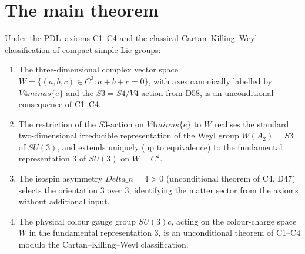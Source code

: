 \documentclass[11pt,a4paper]{article}
\def\Sfour{S4}%
\def\Vfour{V4}%
\def\Sthree{S3}%
\def\SUthree{SU(3)}%
\def\SUthreec{SU(3)c}%
\def\PDL{PDL}%
\def\cong{=}%
\def\setminus{ minus }%
\def\mathbb#1{#1}%
\def\mathrm#1{#1}%
\def\mathbf#1{#1}%
\def\textsc#1{#1}%
\def\Dn{Delta\_n}%
\newenvironment{theorembox}[1][]{%
  \begin{tcolorbox}[theoremstyle,title={Theorem\ifx\relax#1\relax\else: #1\fi}]}{\end{tcolorbox}}
\theoremstyle{plain}
\theoremstyle{definition}
\theoremstyle{remark}
\newcommand{\PDL}{\textsc{PDL}}
\newcommand{\Sfour}{S_4}
\newcommand{\Vfour}{V_4}
\newcommand{\Sthree}{S_3}
\newcommand{\SUthree}{\mathrm{SU}(3)}
\newcommand{\SUthreec}{\mathrm{SU}(3)_c}
\newcommand{\Dn}{\Delta n}
\begin{document}
\section{The main theorem}
\label{sec:theorem}

\begin{theorembox}[Main theorem of D59 --- Fundamental representation \texorpdfstring{$\mathbf{3}$}{3} of \texorpdfstring{$\SUthreec$}{SU(3)c} from C1--C4]
\label{thm:D59_main}
Under the \PDL\ axioms C1--C4 and the classical Cartan--Killing--Weyl classification of compact simple Lie groups:
\begin{enumerate}[label=(\roman*),leftmargin=2em]
\item The three-dimensional complex vector space $W = \{(a,b,c)\in\mathbb{C}^3 : a+b+c=0\}$, with axes canonically labelled by $\Vfour \setminus \{e\}$ and the $\Sthree = \Sfour/\Vfour$ action from D58, is an unconditional consequence of C1--C4.
\item The restriction of the $\Sthree$-action on $\Vfour\setminus\{e\}$ to $W$ realises the standard two-dimensional irreducible representation of the Weyl group $W(A_2) \cong \Sthree$ of $\SUthree$, and extends uniquely (up to equivalence) to the fundamental representation $\mathbf{3}$ of $\SUthree$ on $W\cong\mathbb{C}^2$.
\item The isospin asymmetry $\Dn = 4 > 0$ (unconditional theorem of C4, D47) selects the orientation $\mathbf{3}$ over $\bar{\mathbf{3}}$, identifying the matter sector from the axioms without additional input.
\item The physical colour gauge group $\SUthreec$, acting on the colour-charge space $W$ in the fundamental representation $\mathbf{3}$, is an unconditional theorem of C1--C4 modulo the Cartan--Killing--Weyl classification.
\end{enumerate}
\end{theorembox}
\end{document}
